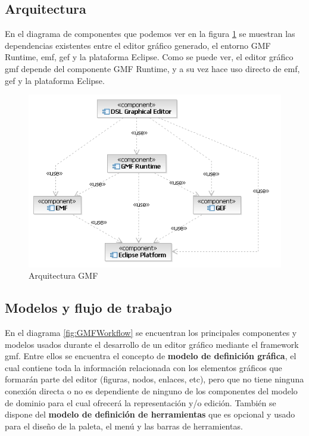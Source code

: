 \documentclass[a4paper,12pt,oneside,spanish]{book}
\begin{document}
\subsection{Arquitectura}

En el diagrama de componentes que podemos ver en la figura \ref{fig:GMFArquitectura} se muestran las dependencias existentes entre el editor gráfico generado, el entorno \textsf{GMF Runtime}, \gls{emf}, \gls{gef} y la plataforma \textsf{Eclipse}. Como se puede ver, el editor gráfico \gls{gmf} depende del componente \textsf{GMF Runtime}, y a su vez hace uso directo de \gls{emf}, \gls{gef} y la plataforma \textsf{Eclipse}.


\begin{figure}[hbtp]
\centering
\includegraphics[scale=.75]{./img/GMFArquitectura}
\caption{Arquitectura GMF}
\label{fig:GMFArquitectura}
\end{figure}


\subsection{Modelos y flujo de trabajo}

En el diagrama \ref{fig:GMFWorkflow} se encuentran los principales componentes y modelos usados durante el desarrollo de un editor gráfico mediante el framework \gls{gmf}. Entre ellos se encuentra el concepto de \textbf{modelo de definición gráfica}, el cual contiene toda la información relacionada con los elementos gráficos que formarán parte del editor (figuras, nodos, enlaces, etc), pero que no tiene ninguna conexión directa o no es dependiente de ninguno de los componentes del modelo de dominio para el cual ofrecerá la representación y/o edición. También se dispone del \textbf{modelo de definición de herramientas} que es opcional y usado para el diseño de la paleta, el menú y las barras de herramientas.
\end{document}
